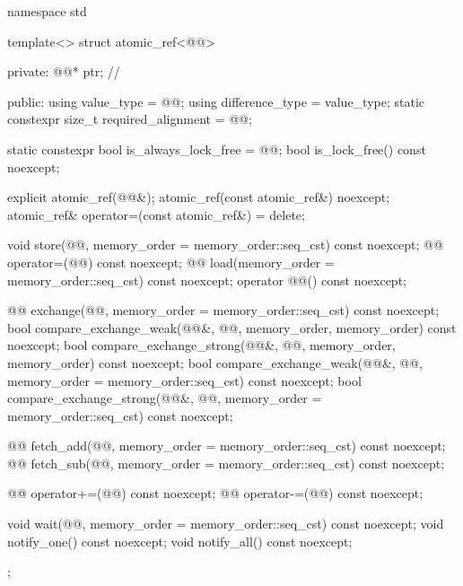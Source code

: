\begin{codeblock}
namespace std {
  template<> struct atomic_ref<@@> {
  private:
    @@* ptr;   // \expos

  public:
    using value_type = @@;
    using difference_type = value_type;
    static constexpr size_t required_alignment = @@;

    static constexpr bool is_always_lock_free = @@;
    bool is_lock_free() const noexcept;

    explicit atomic_ref(@@&);
    atomic_ref(const atomic_ref&) noexcept;
    atomic_ref& operator=(const atomic_ref&) = delete;

    void store(@@, memory_order = memory_order::seq_cst) const noexcept;
    @@ operator=(@@) const noexcept;
    @@ load(memory_order = memory_order::seq_cst) const noexcept;
    operator @@() const noexcept;

    @@ exchange(@@,
                                 memory_order = memory_order::seq_cst) const noexcept;
    bool compare_exchange_weak(@@&, @@,
                               memory_order, memory_order) const noexcept;
    bool compare_exchange_strong(@@&, @@,
                                 memory_order, memory_order) const noexcept;
    bool compare_exchange_weak(@@&, @@,
                               memory_order = memory_order::seq_cst) const noexcept;
    bool compare_exchange_strong(@@&, @@,
                                 memory_order = memory_order::seq_cst) const noexcept;

    @@ fetch_add(@@,
                                  memory_order = memory_order::seq_cst) const noexcept;
    @@ fetch_sub(@@,
                                  memory_order = memory_order::seq_cst) const noexcept;

    @@ operator+=(@@) const noexcept;
    @@ operator-=(@@) const noexcept;

    void wait(@@, memory_order = memory_order::seq_cst) const noexcept;
    void notify_one() const noexcept;
    void notify_all() const noexcept;
  };
}
\end{codeblock}

